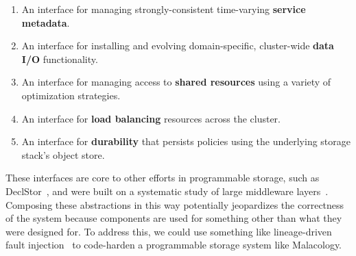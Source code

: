 \begin{enumerate}

\item An interface for managing strongly-consistent time-varying
\textbf{service metadata}.

\item An interface for installing and evolving domain-specific, cluster-wide
\textbf{data I/O} functionality.

\item An interface for managing access to \textbf{shared resources} using a
variety of optimization strategies.

\item An interface for \textbf{load balancing} resources across the cluster.

\item An interface for \textbf{durability} that persists policies using the
underlying storage stack's object store.

\end{enumerate}

These interfaces are core to other efforts in programmable storage, such as
DeclStor~\cite{watkins:hot17-declstor, watkins:techreport16-brados}, and were
built on a systematic study of large middleware
layers~\cite{watkins_invivo_2013, watkins:scc2012-datamods}.  Composing these
abstractions in this way potentially jeopardizes the correctness of the system
because components are used for something other than what they were designed
for. To address this, we could use something like lineage-driven fault
injection~\cite{alvaro:sigmod15-ldfi} to code-harden a programmable storage
system like Malacology.
